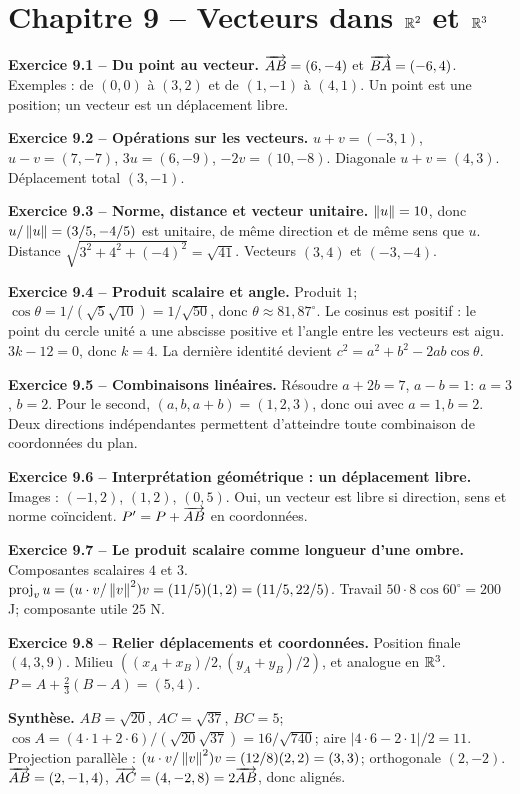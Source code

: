 \chapter*{Chapitre 9 -- Vecteurs dans \texorpdfstring{$\mathbb{R}^2$ et $\mathbb{R}^3$}{R2 et R3}}
\begin{answerbox}
\textbf{Exercice 9.1 -- Du point au vecteur.} $\overrightarrow{AB}=(6,-4)$ et $\overrightarrow{BA}=(-6,4)$. Exemples : de $(0,0)$ à $(3,2)$ et de $(1,-1)$ à $(4,1)$. Un point est une position; un vecteur est un déplacement libre.\par
\textbf{Exercice 9.2 -- Opérations sur les vecteurs.} $u+v=(-3,1)$, $u-v=(7,-7)$, $3u=(6,-9)$, $-2v=(10,-8)$. Diagonale $u+v=(4,3)$. Déplacement total $(3,-1)$.\par
\textbf{Exercice 9.3 -- Norme, distance et vecteur unitaire.} $\left\lVert u\right\rVert=10$, donc $u/\left\lVert u\right\rVert=(3/5,-4/5)$ est unitaire, de même direction et de même sens que $u$. Distance $\sqrt{3^2+4^2+(-4)^2}=\sqrt{41}$. Vecteurs $(3,4)$ et $(-3,-4)$.\par
\textbf{Exercice 9.4 -- Produit scalaire et angle.} Produit $1$; $\cos\theta=1/(\sqrt5\sqrt{10})=1/\sqrt{50}$, donc $\theta\approx81{,}87^\circ$. Le cosinus est positif : le point du cercle unité a une abscisse positive et l'angle entre les vecteurs est aigu. $3k-12=0$, donc $k=4$. La dernière identité devient $c^2=a^2+b^2-2ab\cos\theta$.\par
\textbf{Exercice 9.5 -- Combinaisons linéaires.} Résoudre $a+2b=7$, $a-b=1$: $a=3$, $b=2$. Pour le second, $(a,b,a+b)=(1,2,3)$, donc oui avec $a=1,b=2$. Deux directions indépendantes permettent d'atteindre toute combinaison de coordonnées du plan.\par
\textbf{Exercice 9.6 -- Interprétation géométrique : un déplacement libre.} Images : $(-1,2)$, $(1,2)$, $(0,5)$. Oui, un vecteur est libre si direction, sens et norme coïncident. $P'=P+\overrightarrow{AB}$ en coordonnées.\par
\textbf{Exercice 9.7 -- Le produit scalaire comme longueur d'une ombre.} Composantes scalaires $4$ et $3$. $\operatorname{proj}_v u=(u\cdot v/\left\lVert v\right\rVert^2)v=(11/5)(1,2)=(11/5,22/5)$. Travail $50\cdot8\cos60^\circ=200$ J; composante utile $25$ N.\par
\textbf{Exercice 9.8 -- Relier déplacements et coordonnées.} Position finale $(4,3,9)$. Milieu $((x_A+x_B)/2,(y_A+y_B)/2)$, et analogue en $\mathbb{R}^3$. $P=A+\frac23(B-A)=(5,4)$.\par
\medskip\textbf{Synthèse.} $AB=\sqrt{20}$, $AC=\sqrt{37}$, $BC=5$; $\cos A=(4\cdot1+2\cdot6)/(\sqrt{20}\sqrt{37})=16/\sqrt{740}$; aire $|4\cdot6-2\cdot1|/2=11$. Projection parallèle : $(u\cdot v/\left\lVert v\right\rVert^2)v=(12/8)(2,2)=(3,3)$; orthogonale $(2,-2)$. $\overrightarrow{AB}=(2,-1,4)$, $\overrightarrow{AC}=(4,-2,8)=2\overrightarrow{AB}$, donc alignés.
\end{answerbox}
